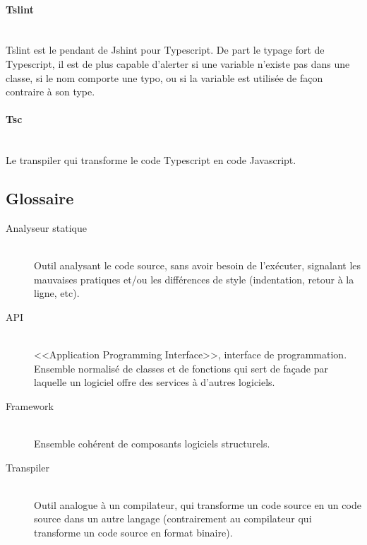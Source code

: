 \documentclass[a4paper,french,12pt]{article}
\begin{document}
		\paragraph{Tslint}~\\	
		Tslint est le pendant de Jshint pour Typescript. De part le typage fort de Typescript, il est de plus capable d'alerter si une variable n'existe pas dans une classe, si le nom comporte une typo, ou si la variable est utilisée de façon contraire à son type.
		
		\paragraph{Tsc}~\\	
		Le transpiler qui transforme le code Typescript en code Javascript.

	\subsection{Glossaire}
		\begin{description}
		
		\item [Analyseur statique]~\\
			Outil analysant le code source, sans avoir besoin de l'exécuter, signalant les mauvaises pratiques et/ou les différences de style (indentation, retour à la ligne, etc).

		\item [API]~\\
		    <<Application Programming Interface>>, interface de programmation. Ensemble normalisé de classes et de
		    fonctions qui sert de façade par laquelle un logiciel offre des services à d'autres logiciels.

		\item [Framework]~\\
		    Ensemble cohérent de composants logiciels structurels.
		    
		\item [Transpiler]~\\
			Outil analogue à un compilateur, qui transforme un code source en un code source dans un autre langage (contrairement au compilateur qui transforme un code source en format binaire).
		

		\end{description}
\end{document}
